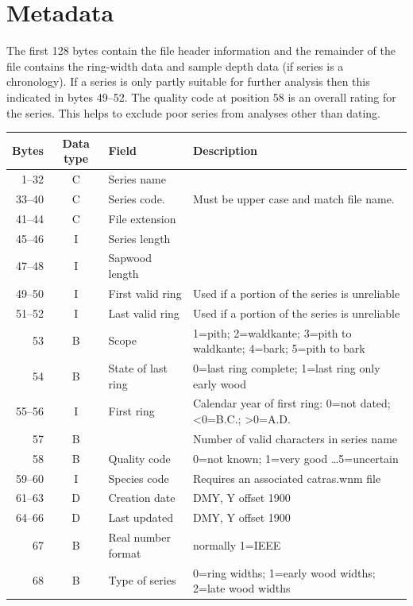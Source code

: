 \section{Metadata}

The first 128 bytes contain the file header information and the remainder of the file contains the ring-width data and sample depth data (if series is a chronology). If a series is only partly suitable for further analysis then this indicated in bytes 49--52. The quality code at position 58 is an overall rating for the series. This helps to exclude poor series from analyses other than dating. 

\begin{table}[htbp]
\begin{center}
\begin{tabular*}{\textwidth}{r c l p{8cm} }
  \toprule
Bytes & Data type & Field & Description \\
\midrule
1--32	& C & Series name & \\
33--40 & C &  Series code. & Must be upper case and match file name. \\
41--44 & C &File extension & \\
45--46 & I & Series length & \\
47--48 & I & Sapwood length &\\
49--50 & I & First valid ring & Used if a portion of the series is unreliable \\
51--52 & I & Last valid ring & Used if a portion of the series is unreliable \\
53       & B & Scope & 1=pith; 2=waldkante; 3=pith to waldkante; 4=bark; 5=pith to bark \\
54       & B & State of last ring & 0=last ring complete; 1=last ring only early wood \\
55--56 & I & First ring & Calendar year of first ring: 0=not dated; <0=B.C.; >0=A.D. \\
57       & B &  & Number of valid characters in series name\\
58       & B & Quality code& 0=not known; 1=very good \ldots 5=uncertain \\
59--60 & I & Species code & Requires an associated catras.wnm file \\
61--63 & D & Creation date & DMY, Y offset 1900 \\
64--66 & D & Last updated & DMY, Y offset 1900 \\
67       & B & Real number format & normally 1=IEEE \\
68       & B & Type of series & 0=ring widths; 1=early wood widths; 2=late wood widths\\

\end{tabular*}
\end{center}
\end{table}
